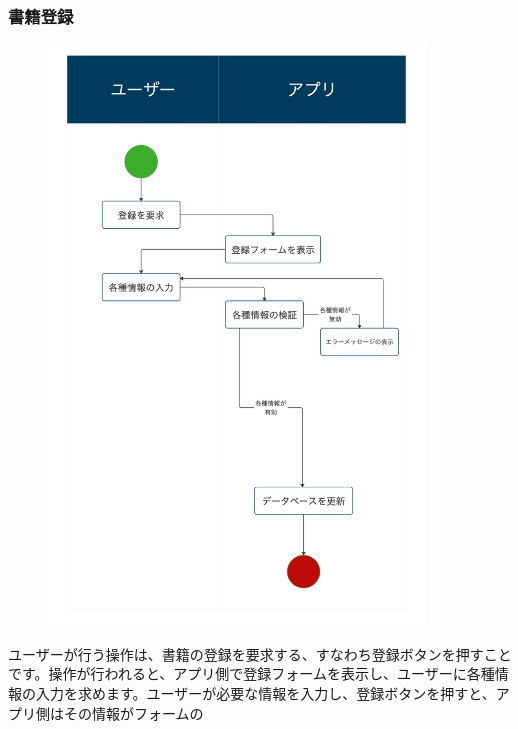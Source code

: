 \documentclass[a4paper, 11pt, titlepage]{jsarticle}
\begin{document}
\subsubsection{書籍登録}
\begin{figure}[h]
\centering
\includegraphics[width=100mm]{flow-touroku.jpg}
\label{fig:func}
\end{figure}

ユーザーが行う操作は、書籍の登録を要求する、すなわち登録ボタンを押すことです。操作が行われると、アプリ側で登録フォームを表示し、ユーザーに各種情報の入力を求めます。ユーザーが必要な情報を入力し、登録ボタンを押すと、アプリ側はその情報がフォームの
\clearpage
\end{document}
